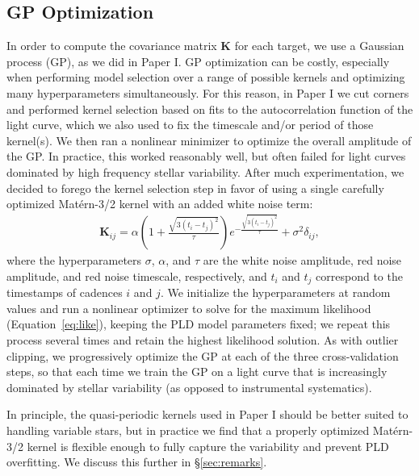 \documentclass[]{emulateapj}
\begin{document}
\subsection{GP Optimization}
\label{sec:impl_gp}
In order to compute the covariance matrix $\mathbf{K}$ for each target, we use a Gaussian
process (GP), as we did in Paper I. GP optimization can be costly, especially when
performing model selection over a range of possible kernels and optimizing many
hyperparameters simultaneously. For this reason, in Paper I we cut corners and performed
kernel selection based on fits to the autocorrelation function of the light curve, which
we also used to fix the timescale and/or period of those kernel(s). We then ran a nonlinear
minimizer to optimize the overall amplitude of the GP. In practice, this worked reasonably
well, but often failed for light curves dominated by high frequency stellar variability.
After much experimentation, we decided to forego the kernel selection step in favor of
using a single carefully optimized Mat\'ern-3/2 kernel with an added white noise term:
%
\begin{align}
\mathbf{K}_{ij} = \alpha \left(1 + \frac{\sqrt{3(t_i - t_j)^2}}{\tau}\right) e^{-\frac{\sqrt{3(t_i - t_j)^2}}{\tau}} + \sigma^2\delta_{ij},
\end{align}
%
where the hyperparameters $\sigma$, $\alpha$, and $\tau$ are the white noise amplitude,
red noise amplitude, and red noise timescale, respectively, and $t_i$ and $t_j$ correspond
to the timestamps of cadences $i$ and $j$. We initialize the hyperparameters at random
values and run a nonlinear optimizer to solve for the maximum likelihood (Equation~\ref{eq:like}),
keeping the PLD model parameters fixed; we repeat this process several times and retain the
highest likelihood solution. As with outlier clipping, we progressively optimize the GP
at each of the three cross-validation steps, so that each time we train the GP on a
light curve that is increasingly dominated by stellar variability (as opposed to instrumental
systematics).

In principle, the quasi-periodic kernels used in Paper I should be better suited to
handling variable stars, but in practice we find that a properly optimized Mat\'ern-3/2
kernel is flexible enough to fully capture the variability and prevent PLD overfitting.
We discuss this further in \S\ref{sec:remarks}.
\end{document}
